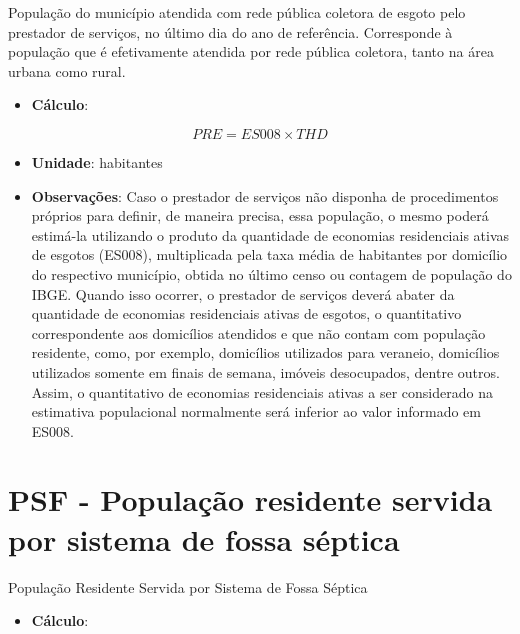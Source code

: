 \documentclass[]{book}
\providecommand{\tightlist}{%
  \setlength{\itemsep}{0pt}\setlength{\parskip}{0pt}}
\begin{document}
População do município atendida com rede pública coletora de esgoto pelo prestador de serviços, no último dia do ano de referência. Corresponde à população que é efetivamente atendida por rede pública coletora, tanto na área urbana como rural.

\begin{itemize}
\tightlist
\item
  \textbf{Cálculo}:
\end{itemize}

\[
PRE = ES008 \times THD
\]

\begin{itemize}
\item
  \textbf{Unidade}: habitantes
\item
  \textbf{Observações}: Caso o prestador de serviços não disponha de procedimentos próprios para definir, de maneira precisa, essa população, o mesmo poderá estimá-la utilizando o produto da quantidade de economias residenciais ativas de esgotos (ES008), multiplicada pela taxa média de habitantes por domicílio do respectivo município, obtida no último censo ou contagem de população do IBGE. Quando isso ocorrer, o prestador de serviços deverá abater da quantidade de economias residenciais ativas de esgotos, o quantitativo correspondente aos domicílios atendidos e que não contam com população residente, como, por exemplo, domicílios utilizados para veraneio, domicílios utilizados somente em finais de semana, imóveis desocupados, dentre outros. Assim, o quantitativo de economias residenciais ativas a ser considerado na estimativa populacional normalmente será inferior ao valor informado em ES008.
\end{itemize}

\hypertarget{psf---populauxe7uxe3o-residente-servida-por-sistema-de-fossa-suxe9ptica}{%
\section*{PSF - População residente servida por sistema de fossa séptica}\label{psf---populauxe7uxe3o-residente-servida-por-sistema-de-fossa-suxe9ptica}}

População Residente Servida por Sistema de Fossa Séptica

\begin{itemize}
\tightlist
\item
  \textbf{Cálculo}:
\end{itemize}
\end{document}
